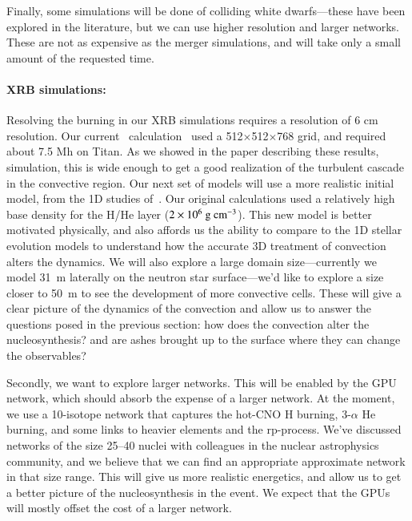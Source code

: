 Finally, some simulations will be done of colliding white
dwarfs---these have been explored in the literature, but we can use
higher resolution and larger networks.  These are not as expensive as
the merger simulations, and will take only a small amount of the
requested time.


\paragraph{XRB simulations: } Resolving the burning in our XRB simulations requires
a resolution of 6 cm resolution.  Our current
\maestro\ calculation~\cite{xrb-3d} used a 512$\times$512$\times$768
grid, and required about 7.5 Mh on Titan.  As we showed in the paper
describing these results, simulation, this is wide enough to get a
good realization of the turbulent cascade in the convective region.
Our next set of models will use a more realistic initial model, from
the 1D studies of~\cite{woosley:2004}.  Our original calculations used
a relatively high base density for the H/He layer ($2\times
10^6~{\mathrm{g~cm^{-3}}}$).  This new model is better motivated physically, and also
affords us the ability to compare to the 1D stellar evolution models
to understand how the accurate 3D treatment of convection alters the
dynamics.  We will also explore a large domain size---currently we
model 31~m laterally on the neutron star surface---we'd like to
explore a size closer to 50~m to see the development of more
convective cells.  These will give a clear picture of the dynamics of
the convection and allow us to answer the questions posed in the
previous section: how does the convection alter the nucleosynthesis?
and are ashes brought up to the surface where they can change the
observables?

Secondly, we want to explore larger networks.  This will be enabled by
the GPU network, which should absorb the expense of a larger network.
At the moment, we use a 10-isotope network that captures the hot-CNO H
burning, 3-$\alpha$ He burning, and some links to heavier elements and
the rp-process.  We've discussed networks of the size 25--40 nuclei
with colleagues in the nuclear astrophysics community, and we believe
that we can find an appropriate approximate network in that size
range.  This will give us more realistic energetics, and allow us to
get a better picture of the nucleosynthesis in the event.  We expect that
the GPUs will mostly offset the cost of a larger network.

